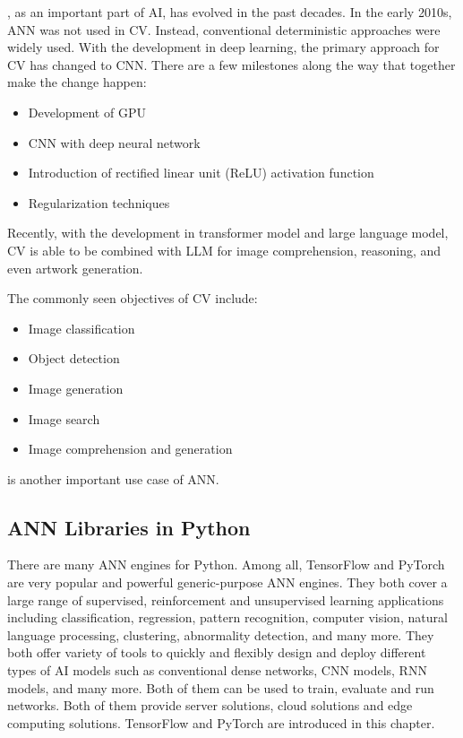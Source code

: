 , as an important part of AI, has evolved in the past decades. In the early 2010s, ANN was not used in CV. Instead, conventional deterministic approaches were widely used. With the development in deep learning, the primary approach for CV has changed to CNN. There are a few milestones along the way that together make the change happen:
\begin{itemize}
  \item Development of GPU
  \item CNN with deep neural network
  \item Introduction of rectified linear unit (ReLU) activation function
  \item Regularization techniques
\end{itemize}
Recently, with the development in transformer model and large language model, CV is able to be combined with LLM for image comprehension, reasoning, and even artwork generation.

The commonly seen objectives of CV include:
\begin{itemize}
  \item Image classification
  \item Object detection
  \item Image generation
  \item Image search
  \item Image comprehension and generation
\end{itemize}

 is another important use case of ANN.

\subsection{ANN Libraries in Python}

There are many ANN engines for Python. Among all, TensorFlow and PyTorch are very popular and powerful generic-purpose ANN engines. They both cover a large range of supervised, reinforcement and unsupervised learning applications including classification, regression, pattern recognition, computer vision, natural language processing, clustering, abnormality detection, and many more. They both offer variety of tools to quickly and flexibly design and deploy different types of AI models such as conventional dense networks, CNN models, RNN models, and many more. Both of them can be used to train, evaluate and run networks. Both of them provide server solutions, cloud solutions and edge computing solutions.  TensorFlow and PyTorch are introduced in this chapter.

